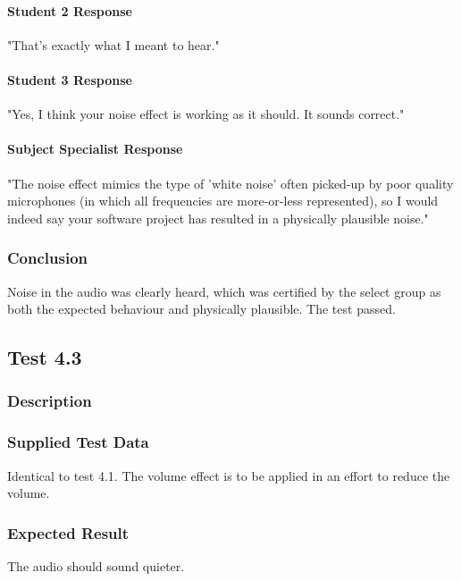 \paragraph{Student 2 Response}
"That's exactly what I meant to hear."

\paragraph{Student 3 Response}
"Yes, I think your noise effect is working as it should. It sounds correct."

\paragraph{Subject Specialist Response}
"The noise effect mimics the type of 'white noise' often picked-up by poor quality microphones (in which all frequencies are more-or-less represented), so I would indeed say your software project has resulted in a physically plausible noise."

\subsubsection{Conclusion}
Noise in the audio was clearly heard, which was certified by the select group as both the expected behaviour and physically plausible. The test passed.


\pagebreak
\subsection{Test 4.3}
\subsubsection{Description}
\paragraph{}
{
	\centering
}

\subsubsection{Supplied Test Data}
Identical to test 4.1. The volume effect is to be applied in an effort to reduce the volume.

\subsubsection{Expected Result}
The audio should sound quieter.

